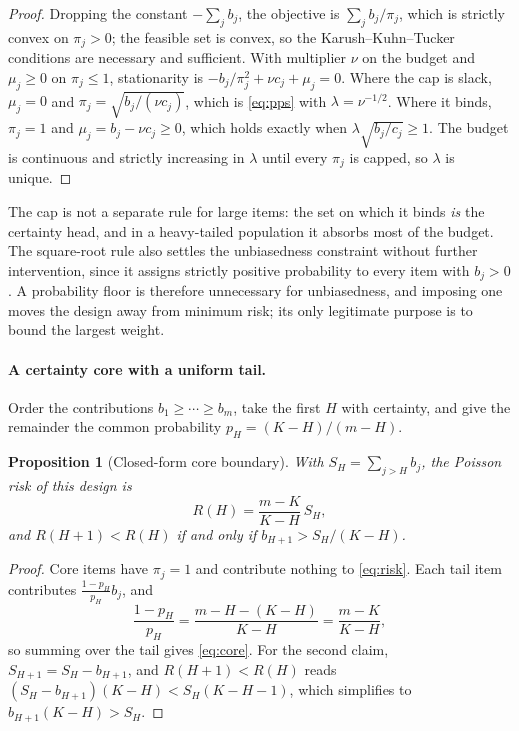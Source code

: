 \documentclass[11pt]{article}
\theoremstyle{plain}
\newtheorem{proposition}{Proposition}
\theoremstyle{remark}
\begin{document}
\begin{proof}
Dropping the constant $-\sum_jb_j$, the objective is $\sum_jb_j/\pi_j$, which is strictly convex on $\pi_j>0$; the feasible set is convex, so the Karush--Kuhn--Tucker conditions are necessary and sufficient. With multiplier $\nu$ on the budget and $\mu_j\ge0$ on $\pi_j\le1$, stationarity is $-b_j/\pi_j^2+\nu c_j+\mu_j=0$. Where the cap is slack, $\mu_j=0$ and $\pi_j=\sqrt{b_j/(\nu c_j)}$, which is \eqref{eq:pps} with $\lambda=\nu^{-1/2}$. Where it binds, $\pi_j=1$ and $\mu_j=b_j-\nu c_j\ge0$, which holds exactly when $\lambda\sqrt{b_j/c_j}\ge1$. The budget is continuous and strictly increasing in $\lambda$ until every $\pi_j$ is capped, so $\lambda$ is unique.
\end{proof} The cap is not a separate rule for large items: the set on which it binds \emph{is} the certainty head, and in a heavy-tailed population it absorbs most of the budget. The square-root rule also settles the unbiasedness constraint without further intervention, since it assigns strictly positive probability to every item with $b_j>0$. A probability floor is therefore unnecessary for unbiasedness, and imposing one moves the design away from minimum risk; its only legitimate purpose is to bound the largest weight.

\paragraph{A certainty core with a uniform tail.} Order the contributions $b_1\ge\cdots\ge b_m$, take the first $H$ with certainty, and give the remainder the common probability $p_H=(K-H)/(m-H)$.

\begin{proposition}[Closed-form core boundary]
\label{prop:core}
With $S_H=\sum_{j>H}b_j$, the Poisson risk of this design is
\begin{equation}
\label{eq:core}
R(H)=\frac{m-K}{K-H}\,S_H ,
\end{equation}
and $R(H+1)<R(H)$ if and only if $b_{H+1}>S_H/(K-H)$.
\end{proposition}

\begin{proof}
Core items have $\pi_j=1$ and contribute nothing to \eqref{eq:risk}. Each tail item contributes $\frac{1-p_H}{p_H}b_j$, and
\[
\frac{1-p_H}{p_H}=\frac{m-H-(K-H)}{K-H}=\frac{m-K}{K-H},
\]
so summing over the tail gives \eqref{eq:core}. For the second claim, $S_{H+1}=S_H-b_{H+1}$, and $R(H+1)<R(H)$ reads $(S_H-b_{H+1})(K-H)<S_H(K-H-1)$, which simplifies to $b_{H+1}(K-H)>S_H$.
\end{proof}
\end{document}
